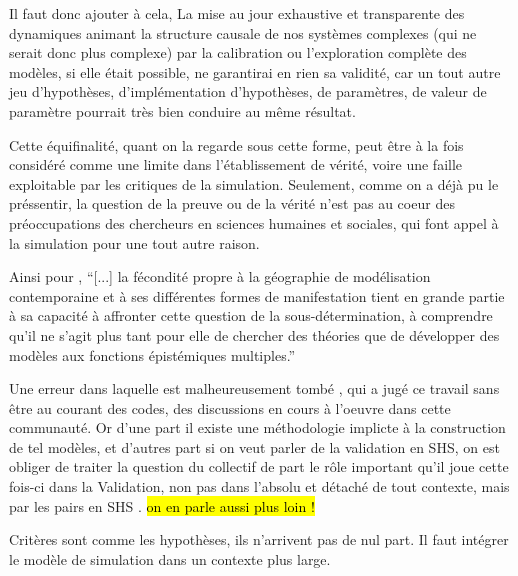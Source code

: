 
Il faut donc ajouter à cela, La mise au jour exhaustive et transparente des dynamiques animant la structure causale de nos systèmes complexes (qui ne serait donc plus complexe) par la calibration ou l'exploration complète des modèles, si elle était possible, ne garantirai en rien sa validité, car un tout autre jeu d'hypothèses, d'implémentation d'hypothèses, de paramètres, de valeur de paramètre pourrait très bien conduire au même résultat.

Cette équifinalité, quant on la regarde sous cette forme, peut être à la fois considéré comme une limite dans l'établissement de vérité, voire une faille exploitable par les critiques de la simulation. Seulement, comme on a déjà pu le préssentir, la question de la preuve ou de la vérité n'est pas au coeur des préoccupations des chercheurs en sciences humaines et sociales, qui font appel à la simulation pour une tout autre raison. 

Ainsi pour \autocite{Varenne2014},  \enquote{[...] la fécondité propre à la géographie de modélisation contemporaine et à ses différentes formes de manifestation tient en grande partie à sa capacité à affronter cette question de la sous-détermination, à comprendre qu’il ne s’agit plus tant pour elle de chercher des théories que de développer des modèles aux fonctions épistémiques multiples.} 



Une erreur dans laquelle est malheureusement tombé \textcite{Yanoff2008}, qui a jugé ce travail sans être au courant des codes, des discussions en cours à l'oeuvre dans cette communauté. Or d'une part il existe une méthodologie implicte à la construction de tel modèles, et d'autres part si on veut parler de la validation en SHS, on est obliger de traiter la question du collectif de part le rôle important qu'il joue cette fois-ci dans la Validation, non pas dans l'absolu et détaché de tout contexte, mais par les pairs en SHS \autocite{Rouchier2013, Ahrweiler2005}. \hl{on en parle aussi plus loin ! } \autocite{}




Critères sont comme les hypothèses, ils n'arrivent pas de nul part. Il faut intégrer le modèle de simulation dans un contexte plus large.

